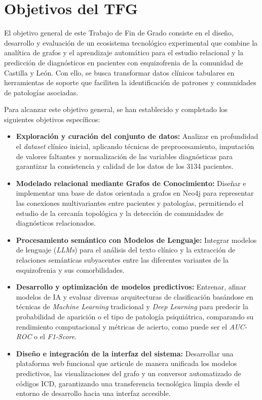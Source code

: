\documentclass[12pt,a4paper,onecolumn,oneside]{report}
\begin{document}
\section{Objetivos del TFG}

El objetivo general de este Trabajo de Fin de Grado consiste en el diseño, desarrollo y evaluación de un ecosistema tecnológico experimental que combine la analítica de grafos y el aprendizaje automático para el estudio relacional y la predicción de diagnósticos en pacientes con esquizofrenia de la comunidad de Castilla y León. Con ello, se busca transformar datos clínicos tabulares en herramientas de soporte que faciliten la identificación de patrones y comunidades de patologías asociadas.

Para alcanzar este objetivo general, se han establecido y completado los siguientes objetivos específicos:

\begin{itemize}
    \item \textbf{Exploración y curación del conjunto de datos:} Analizar en profundidad el \textit{dataset} clínico inicial, aplicando técnicas de preprocesamiento, imputación de valores faltantes y normalización de las variables diagnósticas para garantizar la consistencia y calidad de los datos de los 3134 pacientes.
    \item \textbf{Modelado relacional mediante Grafos de Conocimiento:} Diseñar e implementar una base de datos orientada a grafos en Neo4j para representar las conexiones multivariantes entre pacientes y patologías, permitiendo el estudio de la cercanía topológica y la detección de comunidades de diagnósticos relacionados.
    \item \textbf{Procesamiento semántico con Modelos de Lenguaje:} Integrar modelos de lenguaje (\textit{LLMs}) para el análisis del texto clínico y la extracción de relaciones semánticas subyacentes entre las diferentes variantes de la esquizofrenia y sus comorbilidades.
    \item \textbf{Desarrollo y optimización de modelos predictivos:} Entrenar, afinar modelos de IA y evaluar diversas arquitecturas de clasificación basándose en técnicas de \textit{Machine Learning} tradicional y \textit{Deep Learning} para predecir la probabilidad de aparición o el tipo de patología psiquiátrica, comparando su rendimiento computacional y métricas de acierto, como puede ser el \textit{AUC-ROC} o el \textit{F1-Score}.
    \item \textbf{Diseño e integración de la interfaz del sistema:} Desarrollar una plataforma web funcional que articule de manera unificada los modelos predictivos, las visualizaciones del grafo y un conversor automatizado de códigos ICD, garantizando una transferencia tecnológica limpia desde el entorno de desarrollo hacia una interfaz accesible.
\end{itemize}
\end{document}
